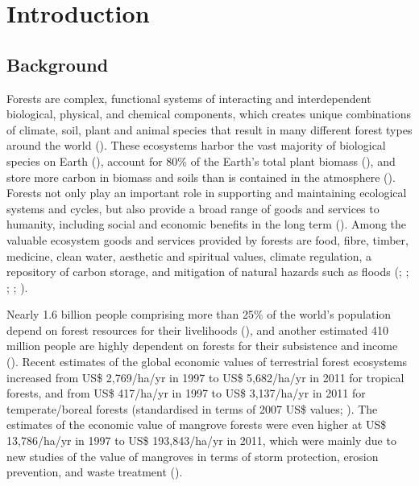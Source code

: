 
\chapter{Introduction}
\label{cha: introduction}

\section{Background}
\label{sec: intro-background}

Forests are complex, functional systems of interacting and interdependent biological, physical, and chemical components, which creates unique combinations of climate, soil, plant and animal species that result in many different forest types around the world (\cite{blanco_forest_2012}). These ecosystems harbor the vast majority of biological species on Earth (\cite{pan_structure_2013}), account for 80\% of the Earth's total plant biomass (\cite{kindermann_global_2008}), and store more carbon in biomass and soils than is contained in the atmosphere (\cite{pan_large_2011}). Forests not only play an important role in supporting and maintaining ecological systems and cycles, but also provide a broad range of goods and services to humanity, including social and economic benefits in the long term (\cite{fao_global_2015}). Among the valuable ecosystem goods and services provided by forests are food, fibre, timber, medicine, clean water, aesthetic and spiritual values, climate regulation, a repository of carbon storage, and mitigation of natural hazards such as floods (\cite{pimentel_value_1997}; \cite{pearce_economic_2001}; \cite{blanco_forest_2012}; \cite{pan_structure_2013}; \cite{chazdon_when_2016}).

Nearly 1.6 billion people comprising more than 25\% of the world’s population depend on forest resources for their livelihoods (\cite{fao_forests_2015}), and another estimated 410 million people are highly dependent on forests for their subsistence and income (\cite{munang_sustaining_2011}). Recent estimates of the global economic values of terrestrial forest ecosystems increased from US\$ 2,769/ha/yr in 1997 to US\$ 5,682/ha/yr in 2011 for tropical forests, and from US\$ 417/ha/yr in 1997 to US\$ 3,137/ha/yr in 2011 for temperate/boreal forests (standardised in terms of 2007 US\$ values; \cite{costanza_changes_2014}). The estimates of the economic value of mangrove forests were even higher at US\$ 13,786/ha/yr in 1997 to US\$ 193,843/ha/yr in 2011, which were mainly due to new studies of the value of mangroves in terms of storm protection, erosion prevention, and waste treatment (\cite{costanza_changes_2014}).

